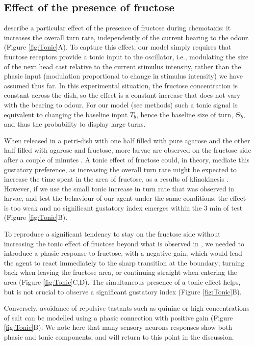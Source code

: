 \documentclass[11pt,a4paper]{article}
\newcommand{\todoBW}[1]{\todo[author=BW,color=orange, size=\tiny,inline]{1}}
\begin{document}
\subsection{Effect of the presence of fructose}
\cite{schleyer2015learning} describe a particular effect of the presence of fructose during chemotaxis: it increases the overall turn rate, independently of the current bearing to the odour. (Figure \ref{fig:Tonic}A). To capture this effect, our model simply requires that fructose receptors provide a tonic input to the oscillator, i.e., modulating the size of the next head cast relative to the current stimulus intensity, rather than the phasic input (modulation proportional to change in stimulus intensity) we have assumed thus far. In this experimental situation, the fructose concentration is constant across the dish, so the effect is a constant increase that does not vary with the bearing to odour. For our model (see methods) such a tonic signal is equivalent to changing the baseline input $T_b$, hence the baseline size of turn, $\Theta_b$, and thus the probability to display large turns. 

When released in a petri-dish with one half filled with pure agarose and the other half filled with agarose and fructose, more larvae are observed on the fructose side after a couple of minutes \citep{schleyer2011behavior}. A tonic effect of fructose could, in theory, mediate this gustatory preference, as increasing the overall turn rate might be expected to increase the time spent in the area of fructose, as a results of klinokinesis \citep{}.
\todoBW{missing citation}
 However, if we use the small tonic increase in turn rate that was observed in larvae, and test the behaviour of our agent under the same conditions, the effect is too weak and no significant gustatory index emerges within the 3 min of test (Figure \ref{fig:Tonic}B).

 To reproduce a significant tendency to stay on the fructose side without increasing the tonic effect of fructose beyond what is observed in \cite{schleyer2015learning}, we needed to introduce a phasic response to fructose, with a negative gain, which would lead the agent to react immediately to the sharp transition at the boundary; turning back when leaving the fructose area, or continuing straight when entering the area (Figure \ref{fig:Tonic}C,D). The simultaneous presence of a tonic effect helps, but is not crucial to observe a significant gustatory index (Figure \ref{fig:Tonic}B).

  Conversely, avoidance of repulsive tastants such as quinine or high concentrations of salt \citep{schleyer2011behavior} can be modelled using a phasic connection with positive gain (Figure \ref{fig:Tonic}B). We note here that many sensory neurons responses show both phasic and tonic components, and will return to this point in the discussion.
\end{document}
